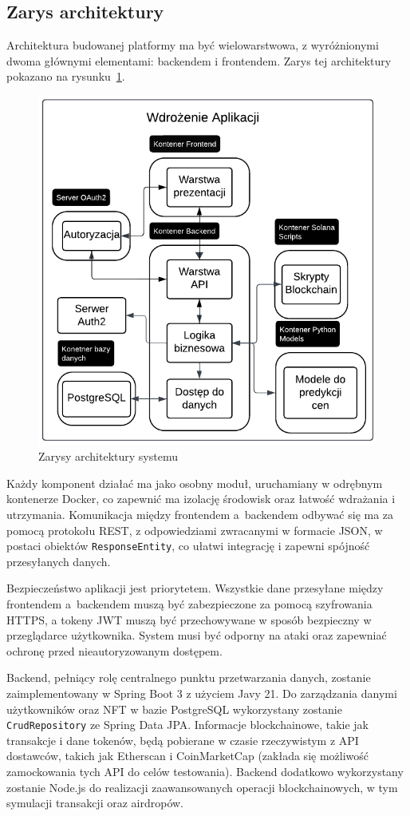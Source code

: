 \subsection{Zarys architektury}\label{subsec:ZarysArchitektury}
Architektura budowanej platformy ma być wielowarstwowa, z wyróżnionymi dwoma głównymi elementami: backendem i frontendem. Zarys tej architektury pokazano na rysunku~\ref{fig:ZarysyArchitekturySystemu}.
\begin{figure}[htb] %
    \centering
    \includegraphics[width=0.7\linewidth]{Diagram.pdf}
    \caption{Zarysy architektury systemu}
    \label{fig:ZarysyArchitekturySystemu}
\end{figure}

Każdy komponent działać ma jako osobny moduł, uruchamiany w odrębnym kontenerze Docker, co zapewnić ma izolację środowisk oraz łatwość wdrażania i utrzymania. Komunikacja między frontendem a~backendem odbywać się ma za pomocą protokołu REST, z odpowiedziami zwracanymi w formacie JSON, w postaci obiektów \texttt{ResponseEntity}, co ułatwi integrację i zapewni spójność przesyłanych danych.

Bezpieczeństwo aplikacji jest priorytetem. Wszystkie dane przesyłane między frontendem a~backendem muszą być zabezpieczone za pomocą szyfrowania HTTPS, a tokeny JWT muszą być przechowywane w sposób bezpieczny w przeglądarce użytkownika. System musi być odporny na ataki oraz zapewniać ochronę przed nieautoryzowanym dostępem.

Backend, pełniący rolę centralnego punktu przetwarzania danych, zostanie zaimplementowany w Spring Boot 3 z użyciem Javy 21. Do zarządzania danymi użytkowników oraz NFT w bazie PostgreSQL wykorzystany zostanie \texttt{CrudRepository} ze Spring Data JPA. Informacje blockchainowe, takie jak transakcje i dane tokenów, będą pobierane w czasie rzeczywistym z API dostawców, takich jak Etherscan i CoinMarketCap (zakłada się możliwość zamockowania tych API do celów testowania). Backend dodatkowo wykorzystany zostanie Node.js do realizacji zaawansowanych operacji blockchainowych, w tym symulacji transakcji oraz airdropów.

